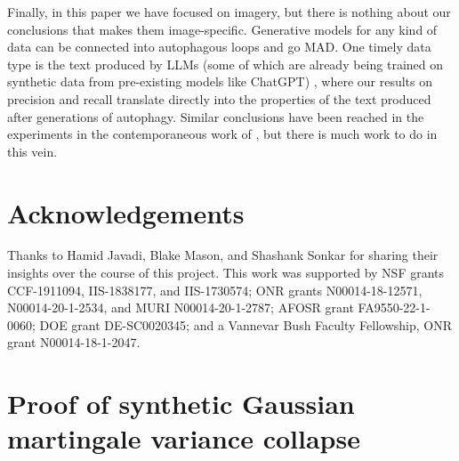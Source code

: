 \documentclass{article}
\begin{document}
Finally, in this paper we have focused on imagery, but there is nothing about our conclusions that makes them image-specific.
Generative models for any kind of data can be connected into autophagous loops and go MAD.
One timely data type is the text produced by LLMs (some of which are already being trained on synthetic data from pre-existing models like ChatGPT) \cite{llms_self_improve, self_instruct, alpaca}, where our results on precision and recall translate directly into the properties of the text produced after generations of autophagy. 
Similar conclusions have been reached in the experiments in the contemporaneous work of \cite{curse_of_recursion}, but there is much work to do in this vein.




\section*{Acknowledgements}

Thanks to Hamid Javadi, Blake Mason, and Shashank Sonkar for sharing their insights over the course of this project.
This work was supported by NSF grants CCF-1911094, IIS-1838177, and IIS-1730574; ONR grants N00014-18-12571, N00014-20-1-2534, and MURI N00014-20-1-2787; AFOSR grant FA9550-22-1-0060; DOE grant DE-SC0020345; and a Vannevar Bush Faculty Fellowship, ONR grant N00014-18-1-2047.




\clearpage

\appendix

\section{Proof of synthetic Gaussian martingale variance collapse}
\label{sec:proof-martingale}
\end{document}
